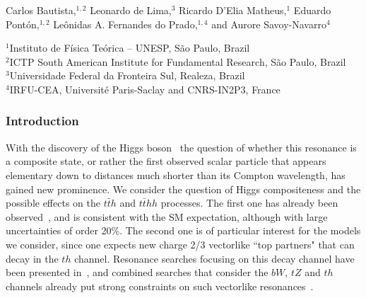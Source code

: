 \def\be{\begin{equation}}
\def\ee{\end{equation}}
\def\bea{\begin{eqnarray}}
\def\eea{\end{eqnarray}}

\medskip
\begin{center}
{Carlos Bautista,$^{1,2}$ Leonardo de Lima,$^3$ Ricardo D'Elia Matheus,$^1$ Eduardo Pont\'on,$^{1,2}$ Le\^onidas A. Fernandes do Prado,$^{1,4}$ and Aurore Savoy-Navarro$^4$}

{\small 
$^1$Instituto de F\'isica Te\'orica -- UNESP, S\~ao Paulo, Brazil \\
$^2$ICTP South American Institute for Fundamental Research, S\~ao Paulo, Brazil \\
$^3$Universidade Federal da Fronteira Sul, Realeza, Brazil \\
$^4$IRFU-CEA, Universit\'e Paris-Saclay and CNRS-IN2P3, France}
\end{center}
\subsubsection{Introduction}

With the discovery of the Higgs boson~\cite{Aad:2012tfa,
Chatrchyan:2012xdj} the question of whether this resonance is a
composite state, or rather the first observed scalar particle that
appears elementary down to distances much shorter than its Compton
wavelength, has gained new prominence.  We consider the question of
Higgs compositeness and the possible effects on the $t\bar{t}h$ and
$t\bar{t}  h h$ processes.  The first one has already been
observed~\cite{Aaboud:2018urx, Sirunyan:2018hoz}, and is consistent
with the SM expectation, although with large uncertainties of order
20\%.  The second one is of particular interest for the models we
consider, since one expects new charge 2/3 vectorlike ``top partners"
that can decay in the $th$ channel.  Resonance searches focusing on
this decay channel have been presented in~\cite{Aaboud:2018xuw}, and
combined searches that consider the $bW$, $tZ$ and $th$ channels
already put strong constraints on such vectorlike
resonances~\cite{Aaboud:2018pii, Sirunyan:2018omb}.

